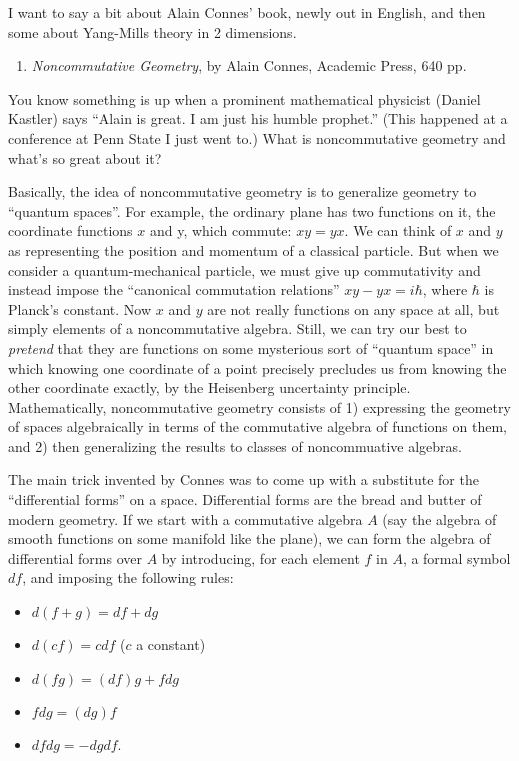 \documentclass{article}
\def\tightlist{}
\begin{document}
I want to say a bit about Alain Connes' book, newly out in English, and
then some about Yang-Mills theory in 2 dimensions.

\begin{enumerate}
\def\labelenumi{\arabic{enumi})}
\tightlist
\item
  \emph{Noncommutative Geometry}, by Alain Connes, Academic Press, 640
  pp.
\end{enumerate}

You know something is up when a prominent mathematical physicist (Daniel
Kastler) says ``Alain is great. I am just his humble prophet.'' (This
happened at a conference at Penn State I just went to.) What is
noncommutative geometry and what's so great about it?

Basically, the idea of noncommutative geometry is to generalize geometry
to ``quantum spaces''. For example, the ordinary plane has two functions
on it, the coordinate functions \(x\) and y, which commute: \(xy = yx\).
We can think of \(x\) and \(y\) as representing the position and
momentum of a classical particle. But when we consider a
quantum-mechanical particle, we must give up commutativity and instead
impose the ``canonical commutation relations'' \(xy - yx = i \hbar\),
where \(\hbar\) is Planck's constant. Now \(x\) and \(y\) are not really
functions on any space at all, but simply elements of a noncommutative
algebra. Still, we can try our best to \emph{pretend} that they are
functions on some mysterious sort of ``quantum space'' in which knowing
one coordinate of a point precisely precludes us from knowing the other
coordinate exactly, by the Heisenberg uncertainty principle.
Mathematically, noncommutative geometry consists of 1) expressing the
geometry of spaces algebraically in terms of the commutative algebra of
functions on them, and 2) then generalizing the results to classes of
noncommuative algebras.

The main trick invented by Connes was to come up with a substitute for
the ``differential forms'' on a space. Differential forms are the bread
and butter of modern geometry. If we start with a commutative algebra
\(A\) (say the algebra of smooth functions on some manifold like the
plane), we can form the algebra of differential forms over \(A\) by
introducing, for each element \(f\) in \(A\), a formal symbol \(df\),
and imposing the following rules:

\begin{itemize}
\tightlist
\item
  \(d(f+g) = df + dg\)
\item
  \(d(cf) = c df\) (\(c\) a constant)
\item
  \(d(fg) = (df)g + f dg\)
\item
  \(fdg = (dg)f\)
\item
  \(df dg = -dg df\).
\end{itemize}
\end{document}
